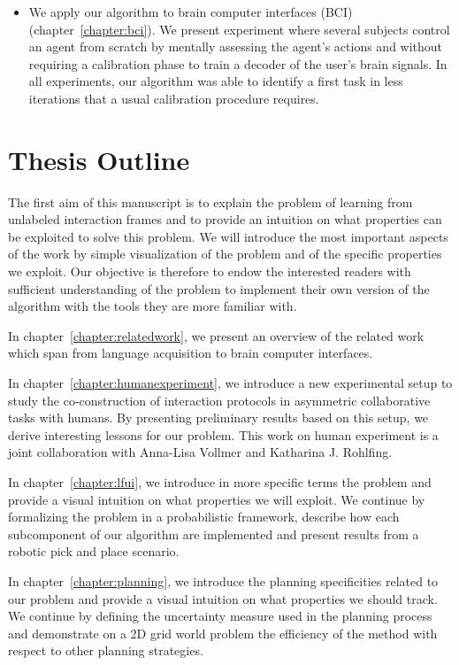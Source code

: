 \begin{itemize}
\item We apply our algorithm to brain computer interfaces (BCI) \cite{grizou2013zero,grizou2014calibration} (chapter~\ref{chapter:bci}). We present experiment where several subjects control an agent from scratch by mentally assessing the agent's actions and without requiring a calibration phase to train a decoder of the user's brain signals. In all experiments, our algorithm was able to identify a first task in less iterations that a usual calibration procedure requires.

\end{itemize}

\section{Thesis Outline}

The first aim of this manuscript is to explain the problem of learning from unlabeled interaction frames and to provide an intuition on what properties can be exploited to solve this problem. We will introduce the most important aspects of the work by simple visualization of the problem and of the specific properties we exploit. Our objective is therefore to endow the interested readers with sufficient understanding of the problem to implement their own version of the algorithm with the tools they are more familiar with.

In chapter~\ref{chapter:relatedwork}, we present an overview of the related work which span from language acquisition to brain computer interfaces.

In chapter~\ref{chapter:humanexperiment}, we introduce a new experimental setup to study the co-construction of interaction protocols in asymmetric collaborative tasks with humans. By presenting preliminary results based on this setup, we derive interesting lessons for our problem. This work on human experiment is a joint collaboration with Anna-Lisa Vollmer and Katharina J. Rohlfing.

In chapter~\ref{chapter:lfui}, we introduce in more specific terms the problem and provide a visual intuition on what properties we will exploit. We continue by formalizing the problem in a probabilistic framework, describe how each subcomponent of our algorithm are implemented and present results from a robotic pick and place scenario.

In chapter~\ref{chapter:planning}, we introduce the planning specificities related to our problem and provide a visual intuition on what properties we should track. We continue by defining the uncertainty measure used in the planning process and demonstrate on a 2D grid world problem the efficiency of the method with respect to other planning strategies.

